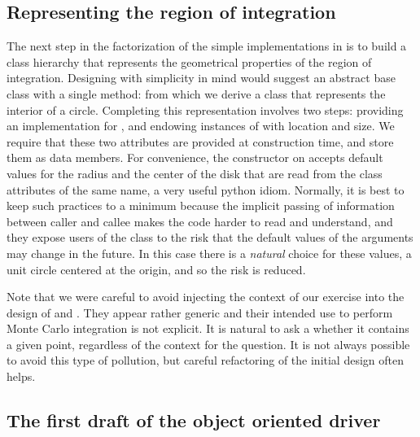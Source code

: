 \subsection{Representing the region of integration}
\label{sec:classes:region}

The next step in the factorization of the simple implementations in  is to build
a class hierarchy that represents the geometrical properties of the region of integration.
Designing with simplicity in mind would suggest an abstract base class  with a
single method:
%
%
from which we derive a class  that represents the interior of a circle.  Completing
this representation involves two steps: providing an implementation for , and
endowing instances of  with location and size. We require that these two attributes
are provided at construction time, and store them as data members.
%
%
For convenience, the constructor on  accepts default values for
the radius and the center of the disk that are read from the class attributes of the same name,
a very useful python idiom. Normally, it is best to keep such practices to a minimum because
the implicit passing of information between caller and callee makes the code harder to read and
understand, and they expose users of the class  to the risk that the default values
of the arguments may change in the future. In this case there is a {\em natural} choice for
these values, a unit circle centered at the origin, and so the risk is reduced.

Note that we were careful to avoid injecting the context of our exercise into the design of
 and . They appear rather generic and their intended use to perform
Monte Carlo integration is not explicit. It is natural to ask a  whether it
contains a given point, regardless of the context for the question. It is not always possible
to avoid this type of pollution, but careful refactoring of the initial design often helps. 

\subsection{The first draft of the object oriented driver}
\label{sec:classes:driver:draft}

